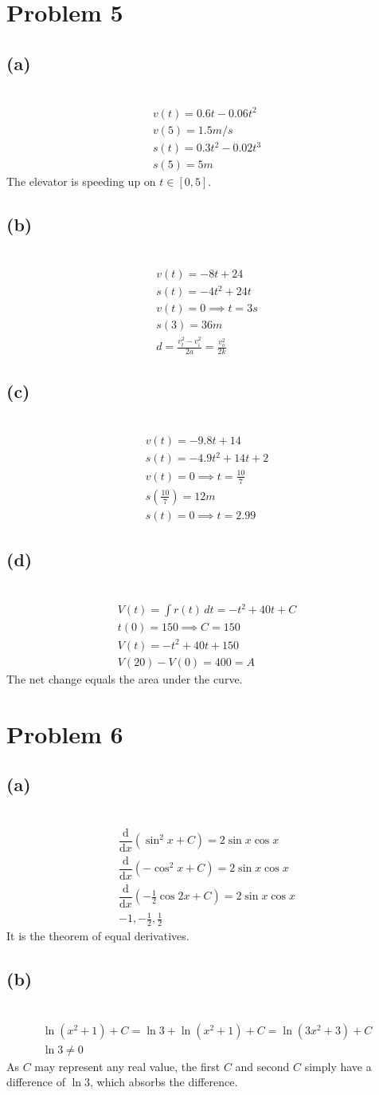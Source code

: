 \documentclass[12pt]{article}
\newcommand*{\deriv}[1][x]{\ensuremath{\dfrac{\mathrm{d}}{\mathrm{d}#1}}}
\newcommand{\vem}{\vspace{0.5em}}
\newcommand{\problem}[1]{\section{Problem #1}}
\newcommand{\subproblem}[1]{\subsection{(#1)} \,}
\begin{document}
\problem{5}

\subproblem{a}
\begin{gather*}
    v(t)=0.6t-0.06t^2\\
    v(5)=1.5m/s\\
    s(t)=0.3t^2-0.02t^3\\
    s(5)=5m
\end{gather*}
The elevator is speeding up on $t\in [0,5]$. \vem

\subproblem{b}
\begin{gather*}
    v(t)=-8t+24\\
    s(t)=-4t^2+24t\\
    v(t)=0 \implies t=3s\\
    s(3)=36m\\
    d=\frac{v_t^2-v_i^2}{2a}=\frac{v_o^2}{2k}
\end{gather*}

\subproblem{c}
\begin{gather*}
    v(t)=-9.8t+14\\
    s(t)=-4.9t^2+14t+2\\
    v(t)=0 \implies t=\frac{10}{7}\\
    s(\frac{10}{7})=12m\\
    s(t)=0 \implies t=2.99
\end{gather*}

\subproblem{d}
\begin{gather*}
    V(t)=\int r(t) \, dt=-t^2+40t+C\\
    t(0)=150 \implies C=150\\
    V(t)=-t^2+40t+150\\
    V(20)-V(0)=400=A
\end{gather*}
The net change equals the area under the curve.

\problem{6}

\subproblem{a}
\begin{gather*}
    \deriv (\sin ^2 x+C)=2 \sin x \cos x\\
    \deriv (-\cos ^2 x+C)=2 \sin x \cos x\\
    \deriv (-\frac{1}{2}\cos 2x+C)=2 \sin x \cos x\\
    -1, -\frac{1}{2}, \frac{1}{2}
\end{gather*}
It is the theorem of equal derivatives. \vem

\subproblem{b}
\begin{gather*}
    \ln(x^2+1)+C=\ln 3+\ln(x^2+1)+C=\ln(3x^2+3)+C\\
    \ln 3\ne 0
\end{gather*}
As $C$ may represent any real value, the first $C$ and second $C$ simply have a difference of $\ln 3$, which absorbs the difference.\vem
\end{document}
